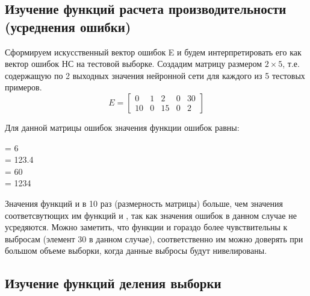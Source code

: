 \subsection{Изучение функций расчета производительности (усреднения ошибки)}


Сформируем искусственный вектор ошибок E и будем интерпретировать его как вектор ошибок НС на тестовой выборке. Создадим матрицу размером $2 \times 5$, т.е. содержащую по 2 выходных значения нейронной сети для каждого из 5 тестовых примеров.
\begin{equation*}
E = \begin{bmatrix}
	0 & 1 & 2 & 0 & 30 \\
	10 & 0 & 15 & 0 & 2
\end{bmatrix}
\end{equation*}

Для данной матрицы ошибок значения функции ошибок равны:
\begin{multicols}{4}
	\centering
	 = 6 \\
	 = 123.4 \\
	 = 60 \\
	 = 1234
\end{multicols}

Значения функций  и  в 10 раз (размерность матрицы) больше, чем значения соответсвутющих им функций  и , так как значения ошибок в данном случае не усредяются. Можно заметить, что функции  и  гораздо более чувствительны к выбросам (элемент 30 в данном случае), соответственно им можно доверять при большом объеме выборки, когда данные выбросы будут нивелированы.

\subsection{Изучение функций деления выборки}


